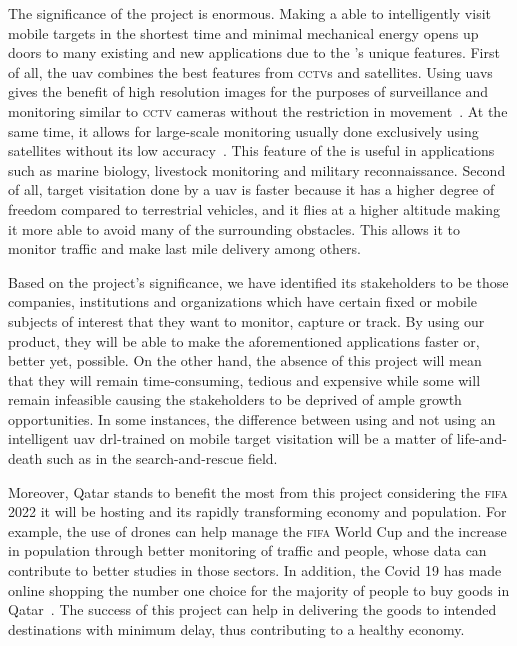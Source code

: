 \documentclass[../main.tex]{subfiles}
\begin{document}
The significance of the project is enormous. 
Making a \uav able to intelligently 
visit mobile targets in the shortest time
and minimal mechanical energy 
opens up doors to many existing and new applications
due to the \uav's unique features.
First of all, the \gls{uav} combines the best features
from \textsc{cctv}s and satellites.
Using \glspl{uav} gives the benefit of high resolution images
for the purposes of surveillance and monitoring
similar to \textsc{cctv} cameras 
without the restriction in movement~\cite{Sha19}.
At the same time, it allows for large-scale monitoring 
usually done exclusively using satellites 
without its low accuracy~\cite{Sha19}.
This feature of the \uav is useful in applications
such as marine biology, livestock monitoring and military
reconnaissance.
Second of all, target visitation done by a \gls{uav}
is faster because it has a higher degree of freedom
compared to terrestrial vehicles, and
it flies at a higher altitude 
making it more able to avoid 
many of the surrounding obstacles.
This allows it to monitor traffic and make last mile delivery
among others.

Based on the project's significance, we have identified 
its stakeholders to be 
those companies, institutions and organizations which
have certain fixed or mobile subjects of interest 
that they want to monitor, capture or track.
By using our product,
they will be able to make the aforementioned applications
faster or,
better yet, possible.
On the other hand, the absence of this project will mean that
they will remain
time-consuming, tedious and expensive
while some will remain infeasible
causing the stakeholders to be deprived of ample growth opportunities.
In some instances, the difference between using 
and not using an intelligent \gls{uav} 
\gls{drl}-trained on mobile target visitation
will be a matter of life-and-death
such as in the search-and-rescue field.

Moreover, Qatar stands to benefit the most from this project 
considering the \textsc{fifa} 2022 it will be hosting
and its rapidly transforming economy and population.
For example, the use of drones can help manage 
the \textsc{fifa} World Cup 
and the increase in population through better monitoring 
of traffic and people, whose data can contribute
to better studies in those sectors.
In addition, the Covid 19 has made online shopping
the number one choice for 
the majority of people to buy goods in Qatar~\cite{Has20}.
The success of this project can help in delivering
the goods to intended destinations with minimum delay,
thus contributing to a healthy economy.
\end{document}
